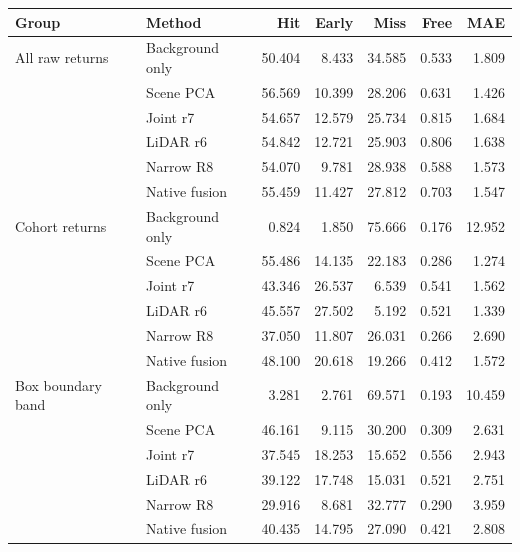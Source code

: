 \begin{tabular}{llrrrrr}
\toprule Group & Method & Hit & Early & Miss & Free & MAE \\
\midrule
All raw returns & Background only & 50.404 & 8.433 & 34.585 & 0.533 & 1.809 \\
 & Scene PCA & 56.569 & 10.399 & 28.206 & 0.631 & 1.426 \\
 & Joint r7 & 54.657 & 12.579 & 25.734 & 0.815 & 1.684 \\
 & LiDAR r6 & 54.842 & 12.721 & 25.903 & 0.806 & 1.638 \\
 & Narrow R8 & 54.070 & 9.781 & 28.938 & 0.588 & 1.573 \\
 & Native fusion & 55.459 & 11.427 & 27.812 & 0.703 & 1.547 \\
\midrule
Cohort returns & Background only & 0.824 & 1.850 & 75.666 & 0.176 & 12.952 \\
 & Scene PCA & 55.486 & 14.135 & 22.183 & 0.286 & 1.274 \\
 & Joint r7 & 43.346 & 26.537 & 6.539 & 0.541 & 1.562 \\
 & LiDAR r6 & 45.557 & 27.502 & 5.192 & 0.521 & 1.339 \\
 & Narrow R8 & 37.050 & 11.807 & 26.031 & 0.266 & 2.690 \\
 & Native fusion & 48.100 & 20.618 & 19.266 & 0.412 & 1.572 \\
\midrule
Box boundary band & Background only & 3.281 & 2.761 & 69.571 & 0.193 & 10.459 \\
 & Scene PCA & 46.161 & 9.115 & 30.200 & 0.309 & 2.631 \\
 & Joint r7 & 37.545 & 18.253 & 15.652 & 0.556 & 2.943 \\
 & LiDAR r6 & 39.122 & 17.748 & 15.031 & 0.521 & 2.751 \\
 & Narrow R8 & 29.916 & 8.681 & 32.777 & 0.290 & 3.959 \\
 & Native fusion & 40.435 & 14.795 & 27.090 & 0.421 & 2.808 \\
\bottomrule\end{tabular}
